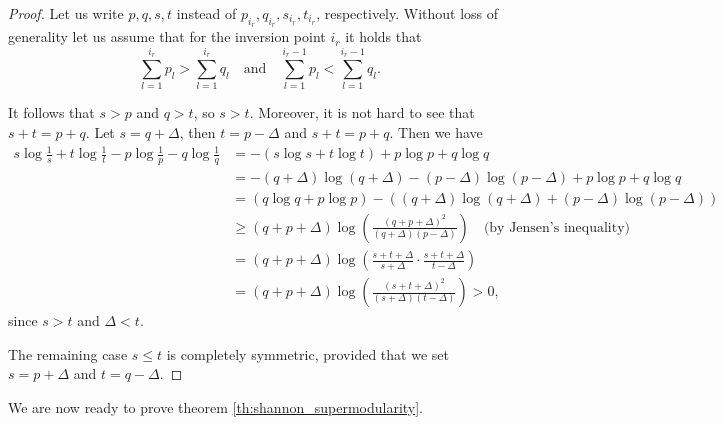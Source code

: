 \begin{proof}
    Let us write $p, q, s, t$ instead of $p_{i_r}, q_{i_r}, s_{i_r}, t_{i_r}$, respectively. Without loss of generality let us assume that for the inversion point $i_r$ it holds that
    \begin{equation}
        \sum_{l=1}^{i_r} p_l > \sum_{l=1}^{i_r} q_l \quad \text{and} \quad \sum_{l=1}^{i_r-1} p_l < \sum_{l=1}^{i_r-1} q_l.
    \end{equation}

    It follows that $s > p$ and $q > t$, so $s > t$. Moreover, it is not hard to see that $s + t = p + q$. Let $s = q + \Delta$, then $t = p - \Delta$ and $s + t = p + q$. Then we have
    \begin{align}
        s \log \frac{1}{s} + t \log \frac{1}{t} - p \log \frac{1}{p} - q \log \frac{1}{q}
        &= - (s \log s + t \log t) + p \log p + q \log q \\
        &= - (q + \Delta) \log (q + \Delta) - (p - \Delta) \log (p - \Delta) + p \log p + q \log q \\
        &= (q \log q + p \log p) - \left( (q + \Delta) \log (q + \Delta) + (p - \Delta) \log (p - \Delta) \right) \\
        &\geq (q + p + \Delta) \log \left( \frac{(q + p + \Delta)^2}{(q + \Delta)(p - \Delta)} \right) \quad \text{(by Jensen's inequality)} \\
        &= (q + p + \Delta) \log \left( \frac{s + t + \Delta}{s + \Delta} \cdot \frac{s + t + \Delta}{t - \Delta} \right) \\
        &= (q + p + \Delta) \log \left( \frac{(s + t + \Delta)^2}{(s + \Delta)(t - \Delta)} \right) > 0,
    \end{align}
    since $s > t$ and $\Delta < t$.

    The remaining case $s \leq t$ is completely symmetric, provided that we set $s = p + \Delta$ and $t = q - \Delta$. \qedhere
\end{proof}

We are now ready to prove theorem \ref{th:shannon_supermodularity}. 

